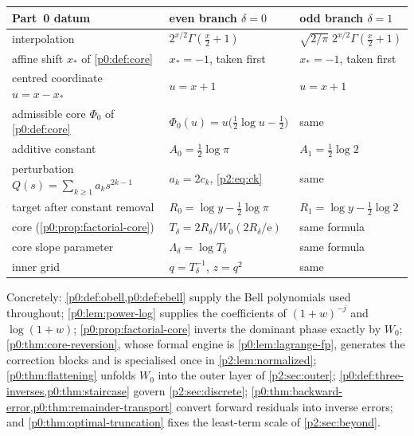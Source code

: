 \documentclass[11pt,a4paper,oneside]{book}
\theoremstyle{plain}
\theoremstyle{definition}
\theoremstyle{remark}
\newcommand{\e}{\mathrm{e}}
\newcommand{\Wlam}{W}
\begin{document}
\begin{center}
\small
\begin{tabular}{p{}p{}p{}}
\toprule
Part~0 datum & even branch \(\delta=0\) & odd branch \(\delta=1\)\\
\midrule
interpolation & \(2^{x/2}\Gamma(\tfrac x2+1)\)
              & \(\sqrt{2/\pi}\;2^{x/2}\Gamma(\tfrac x2+1)\)\\
affine shift \(x_*\) of \cref{p0:def:core} & \(x_*=-1\), taken first & \(x_*=-1\), taken first\\
centred coordinate \(u=x-x_*\) & \(u=x+1\) & \(u=x+1\)\\
admissible core \(\Phi_0\) of \cref{p0:def:core}
  & \(\Phi_0(u)=u\bigl(\tfrac12\log u-\tfrac12\bigr)\) & same\\
additive constant & \(A_0=\tfrac12\log\pi\) & \(A_1=\tfrac12\log2\)\\
perturbation \(Q(s)=\sum_{k\ge1}a_ks^{2k-1}\) & \(a_k=2c_k\), \cref{p2:eq:ck} & same\\
target after constant removal & \(R_0=\log y-\tfrac12\log\pi\)
                              & \(R_1=\log y-\tfrac12\log2\)\\
core (\cref{p0:prop:factorial-core}) & \(T_\delta=2R_\delta/\Wlam_0(2R_\delta/\e)\) & same formula\\
core slope parameter & \(\Lambda_\delta=\log T_\delta\) & same formula\\
inner grid & \(q=T_\delta^{-1}\), \(z=q^2\) & same\\
\bottomrule
\end{tabular}
\end{center}

Concretely: \cref{p0:def:obell,p0:def:ebell} supply the Bell polynomials used
throughout; \cref{p0:lem:power-log} supplies the coefficients of
\((1+w)^{-j}\) and \(\log(1+w)\); \cref{p0:prop:factorial-core} inverts the
dominant phase exactly by \(\Wlam_0\); \cref{p0:thm:core-reversion}, whose
formal engine is \cref{p0:lem:lagrange-fp}, generates the correction blocks and
is specialised once in \cref{p2:lem:normalized};
\cref{p0:thm:flattening} unfolds \(\Wlam_0\) into the outer layer of
\cref{p2:sec:outer}; \cref{p0:def:three-inverses,p0:thm:staircase} govern
\cref{p2:sec:discrete}; \cref{p0:thm:backward-error,p0:thm:remainder-transport}
convert forward residuals into inverse errors; and
\cref{p0:thm:optimal-truncation} fixes the least-term scale of
\cref{p2:sec:beyond}.
\end{document}
